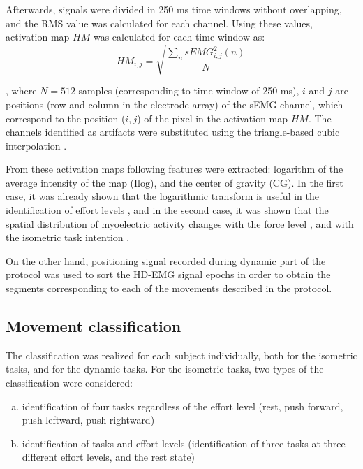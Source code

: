 Afterwards, signals were divided in 250 ms time windows without overlapping, and the RMS value was calculated for each channel. Using these values, activation map $HM$ was calculated for each time window as:
\begin{equation} \label{eq:4-1}
HM_{i,j} = \sqrt{\frac{\sum_n{sEMG_{i,j}^2 (n)}}{N}}
\end{equation}

, where $N=512$ samples (corresponding to time window of 250 ms), $i$ and $j$ are positions (row and column in the electrode array) of the sEMG channel, which correspond to the position ($i,j$) of the pixel in the activation map $HM$. The channels identified as artifacts were substituted using the triangle-based cubic interpolation \citep{Rojas-Martinez2012}.

From these activation maps following features were extracted: logarithm of the average intensity of the map (Ilog), and the center of gravity (CG). In the first case, it was already shown that the logarithmic transform is useful in the identification of effort levels \citep{Rojas-Martinez2012}, and in the second case, it was shown that the spatial distribution of myoelectric activity changes with the force level \citep{Holtermann2005}, and with the isometric task intention \citep{Jordanic2016a}.

On the other hand, positioning signal recorded during dynamic part of the protocol was used to sort the HD-EMG signal epochs in order to obtain the segments corresponding to each of the movements described in the protocol.


\subsection{Movement classification}
The classification was realized for each subject individually, both for the isometric tasks, and for the dynamic tasks. For the isometric tasks, two types of the classification were considered:

\begin{enumerate}[a)]
\item identification of four tasks regardless of the effort level (rest, push forward, push leftward, push rightward)

\item identification of tasks and effort levels (identification of three tasks at three different effort levels, and the rest state)
\end{enumerate}

